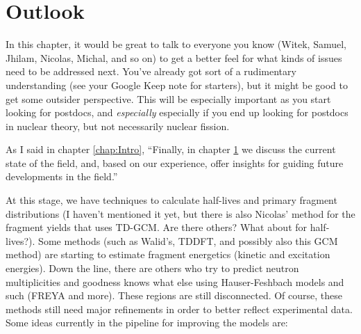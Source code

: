 \chapter{Outlook}\label{chap:Outlook}
\maketitle

In this chapter, it would be great to talk to everyone you know (Witek, Samuel, Jhilam, Nicolas, Michal, and so on) to get a better feel for what kinds of issues need to be addressed next. You've already got sort of a rudimentary understanding (see your Google Keep note for starters), but it might be good to get some outsider perspective. This will be especially important as you start looking for postdocs, and \textit{especially} especially if you end up looking for postdocs in nuclear theory, but not necessarily nuclear fission.

As I said in chapter \ref{chap:Intro}, ``Finally, in chapter \ref{chap:Outlook} we discuss the current state of the field, and, based on our experience, offer insights for guiding future developments in the field.''

At this stage, we have techniques to calculate half-lives and primary fragment distributions (I haven't mentioned it yet, but there is also Nicolas' method for the fragment yields that uses TD-GCM. Are there others? What about for half-lives?). Some methods (such as Walid's, TDDFT, and possibly also this GCM method) are starting to estimate fragment energetics (kinetic and excitation energies). Down the line, there are others who try to predict neutron multiplicities and goodness knows what else using Hauser-Feshbach models and such (FREYA and more). These regions are still disconnected. Of course, these methods still need major refinements in order to better reflect experimental data. Some ideas currently in the pipeline for improving the models are:

